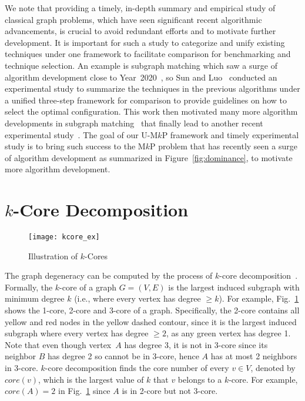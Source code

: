 \documentclass[sigconf, nonacm]{acmart}
\begin{document}
We note that providing a timely, in-depth summary and empirical study of classical graph problems, which have seen significant recent algorithmic advancements, is crucial to avoid redundant efforts and to motivate further development. 
It is important for such a study to categorize and unify existing techniques under one framework to facilitate comparison for benchmarking and technique selection. An example is subgraph matching which saw a surge of algorithm development close to Year~2020~\cite{CFL,CECI,DP-iso}, so Sun and Luo~\cite{DBLP:conf/sigmod/Sun020} conducted an experimental study to summarize the techniques in the previous algorithms under a unified three-step framework for comparison to provide guidelines on how to select the optimal configuration. This work then motivated many more algorithm developments in subgraph matching~\cite{VEQ,CaLiG,GuP} that finally lead to another recent experimental study~\cite{DBLP:journals/pacmmod/ZhangLZL24}. The goal of our U-M$k$P framework and timely experimental study is to bring such success to the M$k$P problem that has recently seen a surge of algorithm development as summarized in Figure~\ref{fig:dominance}, to motivate more algorithm development.

\pagebreak




\clearpage

\appendix
\section{$k$-Core Decomposition}\label{appendix:core}

\begin{figure}[t]
\centering
\texttt{[image: kcore\_ex]}
\caption{Illustration of $k$-Cores}\label{kcore_ex}
\vspace{3mm}
\end{figure}

The graph degeneracy can be computed by the process of $k$-core decomposition~\cite{seidman1983network}. Formally, the $k$-core of a graph $G=(V, E)$ is the largest induced subgraph with minimum degree $k$ (i.e., where every vertex has degree $\geq k$). For example, Fig.~\ref{kcore_ex} shows the 1-core, 2-core and 3-core of a graph. 
Specifically, the 2-core contains all yellow and red nodes in the yellow dashed contour, since it is the largest induced subgraph where every vertex has degree $\geq 2$, as any green vertex has degree 1. 
Note that even though vertex~$A$ has degree 3, it is not in 3-core since its neighbor $B$ has degree 2 so cannot be in 3-core, hence $A$ has at most 2 neighbors in 3-core. $k$-core decomposition finds the core number of every $v\in V$, 
denoted by $core(v)$, which is the largest value of $k$ that $v$ belongs to a $k$-core. 
For example, $core(A)=2$ in Fig.~\ref{kcore_ex} since $A$ is in 2-core but not 3-core.
\end{document}
